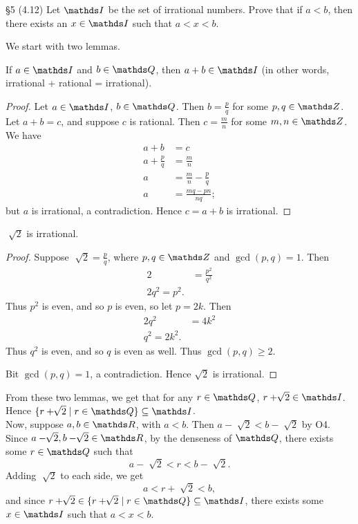\documentclass{homework}
\begin{document}
\begin{problem}{\S 5}
  (4.12) Let $\I$ be the set of irrational numbers. Prove that if $a<b$, then there exists an $x\in
  \I$ such that $a<x<b$.
\end{problem}
\begin{solution}
  We start with two lemmas.
  \begin{lemma}[]{}
    If $a\in \I$ and $b\in \Q$, then $a+b\in \I$ (in other words, irrational + rational =
    irrational).
  \end{lemma}
  \begin{proof}[Proof]
    Let $a\in \I$, $b\in \Q$. Then $b=\frac{p}{q}$ for some $p,q\in \Z$. Let $a+b=c$, and suppose
    $c$ is rational. Then $c=\frac{m}{n}$ for some $m,n\in \Z$. We have
    \begin{align*}
      a+b &= c \\
      a+\frac{p}{q}&= \frac{m}{n} \\
      a&= \frac{m}{n}-\frac{p}{q} \\
      a&= \frac{mq-pn}{nq}
    ;\end{align*} but $a$ is irrational, a contradiction. Hence $c=a+b$ is irrational.
  \end{proof}
  \begin{lemma}[]{}
    $\sqrt[]{2} $ is irrational.
  \end{lemma}
  \begin{proof}[Proof]
    Suppose $\sqrt[]{2} =\frac{p}{q}$, where $p,q\in \Z $ and $\gcd{(p,q)}=1$. Then
    \begin{align*}
      2&=\frac{p^2}{q^2}\\
      2q^2=p^2
    .\end{align*}
    Thus $p^2$ is even, and so $p$ is even, so let $p=2k$. Then
    \begin{align*}
      2q^2&= 4k^2 \\
      q^2=2k^2
    .\end{align*}
    Thus $q^2$ is even, and so $q$ is even as well. Thus $\gcd{(p,q)}\ge 2$.

    Bit $\gcd{(p,q)}=1$, a contradiction. Hence $\sqrt{2} $ is irrational.
  \end{proof}
  From these two lemmas, we get that for any $r\in \Q$, $r+\sqrt[]{2} \in \I$. Hence $\{r+\sqrt[]{2}
  \mid r\in \Q\} \subseteq \I$.\\
  Now, suppose $a,b\in \R$, with $a<b$. Then $a-\sqrt[]{2} <b-\sqrt[]{2} $ by O4. Since
  $a-\sqrt[]{2} ,b-\sqrt[]{2} \in \R$, by the denseness of $ \Q$, there exists some $r\in \Q$ such
  that \[
    a-\sqrt[]{2} <r<b-\sqrt[]{2} 
  .\] 
  Adding $\sqrt[]{2} $ to each side, we get \[
    a < r+\sqrt[]{2} <b
  ,\]  and since $r+\sqrt[]{2} \in \{r+\sqrt[]{2} \mid r\in \Q\} \subseteq \I$, there exists some
  $x\in \I$ such that $a<x<b$.
  
\end{solution}
\end{document}
